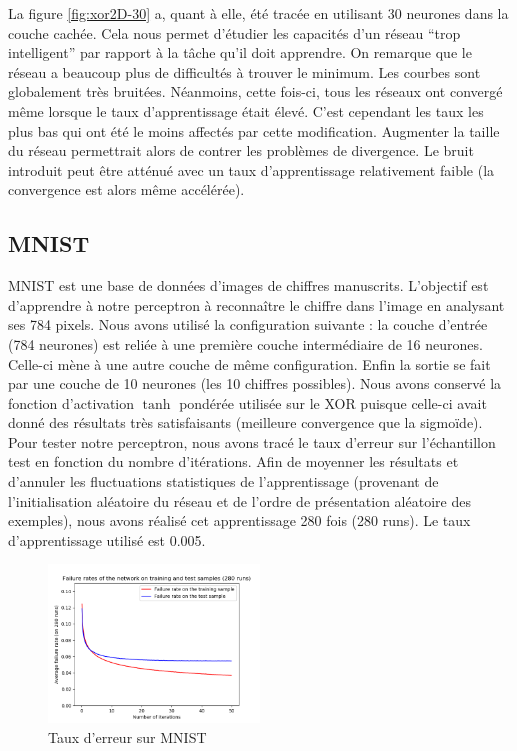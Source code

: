 La figure \ref{fig:xor2D-30} a, quant à elle, été tracée en utilisant 30 neurones dans la couche cachée. Cela nous permet d'étudier les capacités d'un réseau ``trop intelligent'' par rapport à la tâche qu'il doit apprendre. On remarque que le réseau a beaucoup plus de difficultés à trouver le minimum. Les courbes sont globalement très bruitées. Néanmoins, cette fois-ci, tous les réseaux ont convergé même lorsque le taux d'apprentissage était élevé. C'est cependant les taux les plus bas qui ont été le moins affectés par cette modification. Augmenter la taille du réseau permettrait alors de contrer les problèmes de divergence. Le bruit introduit peut être atténué avec un taux d'apprentissage relativement faible (la convergence est alors même accélérée).

\subsection{MNIST}

MNIST est une base de données d'images de chiffres manuscrits. L'objectif est d'apprendre à notre perceptron à reconnaître le chiffre dans l'image en analysant ses 784 pixels. Nous avons utilisé la configuration suivante : la couche d'entrée (784 neurones) est reliée à une première couche intermédiaire de 16 neurones. Celle-ci mène à une autre couche de même configuration. Enfin la sortie se fait par une couche de 10 neurones (les 10 chiffres possibles). Nous avons conservé la fonction d'activation $\tanh$ pondérée utilisée sur le XOR puisque celle-ci avait donné des résultats très satisfaisants (meilleure convergence que la sigmoïde).
Pour tester notre perceptron, nous avons tracé le taux d'erreur sur l'échantillon test en fonction du nombre d'itérations. Afin de moyenner les résultats et d'annuler les fluctuations statistiques de l'apprentissage (provenant de l'initialisation aléatoire du réseau et de l'ordre de présentation aléatoire des exemples),
nous avons réalisé cet apprentissage 280 fois (280 runs). Le taux d'apprentissage utilisé est 0.005.

\begin{figure}[h]
 \centering
 \includegraphics[width=0.5\textwidth]{img/MNIST.png}
 \caption{Taux d'erreur sur MNIST}
 \label{fig:MNIST}
\end{figure}

